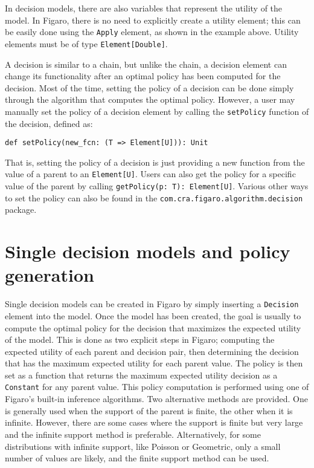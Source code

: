 In decision models, there are also variables that represent the utility of the model. In Figaro, there is no need to explicitly create a utility element; this can be easily done using the \texttt{Apply} element, as shown in the example above. Utility elements must be of type \texttt{Element[Double]}.

A decision is similar to a chain, but unlike the chain, a decision element can change its functionality after an optimal policy has been computed for the decision. Most of the time, setting the policy of a decision can be done simply through the algorithm that computes the optimal policy. However, a user may manually set the policy of a decision element by calling the \texttt{setPolicy} function of the decision, defined as:

\begin{flushleft}
\texttt{def setPolicy(new\_fcn: (T => Element[U])): Unit}
\end{flushleft}

That is, setting the policy of a decision is just providing a new function from the value of a parent to an \texttt{Element[U]}. Users can also get the policy for a specific value of the parent by calling \texttt{getPolicy(p: T): Element[U]}. Various other ways to set the policy can also be found in the \texttt{com.cra.figaro.algorithm.decision} package.

\section{Single decision models and policy generation}

Single decision models can be created in Figaro by simply inserting a \texttt{Decision} element into the model. Once the model has been created, the goal is usually to compute the optimal policy for the decision that maximizes the expected utility of the model. This is done as two explicit steps in Figaro; computing the expected utility of each parent and decision pair, then determining the decision that has the maximum expected utility for each parent value. The policy is then set as a function that returns the maximum expected utility decision as a \texttt{Constant}  for any parent value. This policy computation is performed using one of Figaro's built-in inference algorithms. Two alternative methods are provided. One is generally used when the support of the parent is finite, the other when it is infinite. However, there are some cases where the support is finite but very large and the infinite support method is preferable. Alternatively, for some distributions with infinite support, like Poisson or Geometric, only a small number of values are likely, and the finite support method can be used.

